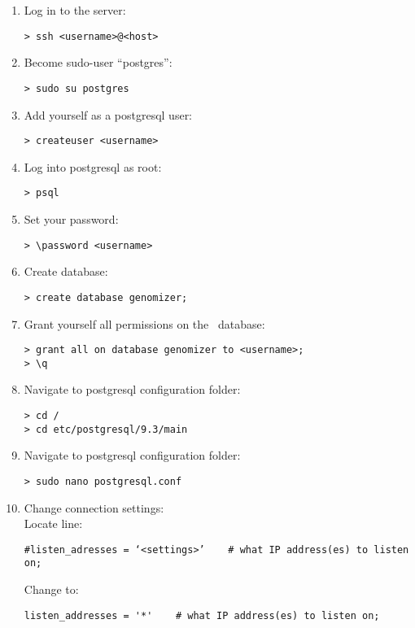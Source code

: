     \begin{enumerate}
      \item Log in to the server:
      \begin{verbatim}
> ssh <username>@<host>
      \end{verbatim}

      \item Become sudo-user “postgres”:
      \begin{verbatim}
> sudo su postgres
      \end{verbatim}

      \item Add yourself as a postgresql user:
      \begin{verbatim}
> createuser <username>
      \end{verbatim}

      \item Log into postgresql as root:
      \begin{verbatim}
> psql
      \end{verbatim}

      \item Set your password:
      \begin{verbatim}
> \password <username>
      \end{verbatim}

      \item Create database:
      \begin{verbatim}
> create database genomizer;
      \end{verbatim}

      \item Grant yourself all permissions on the \appName\ database: \begin{verbatim}
> grant all on database genomizer to <username>;
> \q
      \end{verbatim}

      \item Navigate to postgresql configuration folder:
      \begin{verbatim}
> cd /
> cd etc/postgresql/9.3/main
      \end{verbatim}

      \item Navigate to postgresql configuration folder:
      \begin{verbatim}
> sudo nano postgresql.conf
      \end{verbatim}

      \item Change connection settings:\\Locate line: 
      \begin{verbatim}
#listen_adresses = ‘<settings>’    # what IP address(es) to listen on;
      \end{verbatim}
      Change to:
      \begin{verbatim}
listen_addresses = '*'    # what IP address(es) to listen on;
      \end{verbatim}


\end{enumerate}

